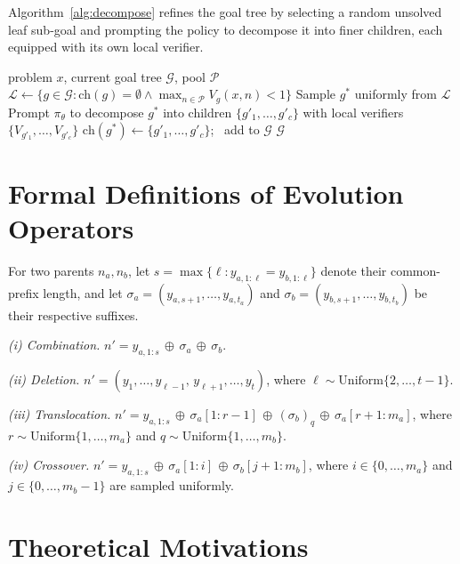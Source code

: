\documentclass{llmxive}
\begin{document}
Algorithm~\ref{alg:decompose} refines the goal tree by selecting a random unsolved leaf sub-goal and prompting the policy to decompose it into finer children, each equipped with its own local verifier.

\begin{algorithm}[h]
\caption{\textsc{BackwardDecompose}: Goal Tree Decomposition}
\label{alg:decompose}
\begin{algorithmic}[1]
\Require problem $x$, current goal tree $\mathcal{G}$, pool $\mathcal{P}$
\State $\mathcal{L} \leftarrow \{g \in \mathcal{G} : \mathrm{ch}(g) = \emptyset \wedge \max_{n \in \mathcal{P}} V_g(x, n) < 1\}$ 
\State Sample $g^*$ uniformly from $\mathcal{L}$
\State Prompt $\pi_\theta$ to decompose $g^*$ into children $\{g'_1, \ldots, g'_c\}$ with local verifiers $\{V_{g'_1}, \ldots, V_{g'_c}\}$
\State $\mathrm{ch}(g^*) \leftarrow \{g'_1, \ldots, g'_c\}$; \, add to $\mathcal{G}$
\State \Return $\mathcal{G}$
\end{algorithmic}
\end{algorithm}

\section{Formal Definitions of Evolution Operators}
\label{app:operators}

For two parents $n_a, n_b$, let $s=\max\{\ell:y_{a,1:\ell}=y_{b,1:\ell}\}$ denote their common-prefix length, and let $\sigma_a=(y_{a,s+1},\dots,y_{a,t_a})$ and $\sigma_b=(y_{b,s+1},\dots,y_{b,t_b})$ be their respective suffixes.

\textit{(i) Combination.} $n' = y_{a,1:s}\,\oplus\,\sigma_a\,\oplus\,\sigma_b$.

\textit{(ii) Deletion.} $n' = (y_{1},\dots,y_{\ell-1},\,y_{\ell+1},\dots,y_{t})$, where $\ell\sim\mathrm{Uniform}\{2,\dots,t-1\}$.

\textit{(iii) Translocation.} $n' = y_{a,1:s}\,\oplus\,\sigma_a[1:r-1]\,\oplus\,(\sigma_b)_q\,\oplus\,\sigma_a[r+1:m_a]$, where $r\sim\mathrm{Uniform}\{1,\dots,m_a\}$ and $q\sim\mathrm{Uniform}\{1,\dots,m_b\}$.

\textit{(iv) Crossover.} $n' = y_{a,1:s}\,\oplus\,\sigma_a[1:i]\,\oplus\,\sigma_b[j+1:m_b]$, where $i\in\{0,\dots,m_a\}$ and $j\in\{0,\dots,m_b-1\}$ are sampled uniformly.

\section{Theoretical Motivations}
\label{app:theory}
\end{document}

